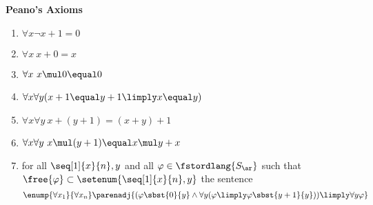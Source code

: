 \textbf{\Large Peano's Axioms}
\begin{enumerate}[1.]
%
\item $\forall x \neg x + 1 \equal 0$
%
\item $\forall x \ x + 0 \equal x$
%
\item $\forall x \ x \mul 0 \equal 0$
%
\item $\forall x \forall y (x + 1 \equal y + 1 \limply x \equal y)$
%
\item $\forall x \forall y \ x + (y + 1) \equal (x + y) + 1$
%
\item $\forall x \forall y \ x \mul (y + 1) \equal x \mul y + x$
%
\item for all $\seq[1]{x}{n}, y$ and all $\varphi \in \fstordlang{S_\ar}$ such that $\free{\varphi} \subset \setenum{\seq[1]{x}{n}, y}$ the sentence
\[
\enump{\forall x_1}{\forall x_n}\parenadj{(\varphi\sbst{0}{y} \land \forall y (\varphi \limply \varphi\sbst{y + 1}{y})) \limply \forall y \varphi}
\]
%
\end{enumerate}
